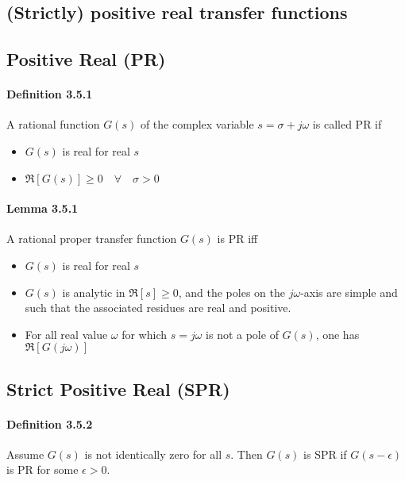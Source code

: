 \subsection{(Strictly) positive real transfer functions}

\subsection{Positive Real (PR)}
\paragraph{Definition 3.5.1}
A rational function $G(s)$ of the complex variable $s=\sigma + j\omega$ is called PR if
\begin{itemize}
	\item $G(s)$ is real for real $s$
	\item $\Re[G(s)] \geq 0 \quad \forall \quad \sigma > 0$
\end{itemize}

\paragraph{Lemma 3.5.1}
A rational proper transfer function $G(s)$ is PR iff
\begin{itemize}
	\item $G(s)$ is real for real $s$
	\item $G(s)$ is analytic in $\Re[s] \geq 0$, and the poles on the $j\omega$-axis are simple and such that the associated residues are real and positive.
	\item For all real value $\omega$ for which $s = j \omega$ is not a pole of $G(s)$, one has $\Re[G(j\omega)]$
\end{itemize}

\subsection{Strict Positive Real (SPR)}
\paragraph{Definition 3.5.2}
Assume $G(s)$ is not identically zero for all $s$. Then $G(s)$ is SPR if $G(s-\epsilon)$ is PR for some $\epsilon > 0$.

